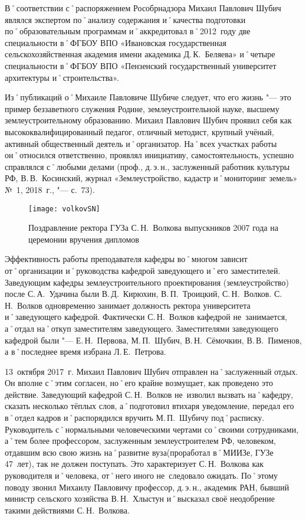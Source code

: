 В˚соответствии с˚распоряжением Рособрнадзора Михаил Павлович Шубич являлся экспертом по˚анализу содержания и˚качества подготовки по˚образовательным программам и˚аккредитовал в˚2012~году две специальности в˚ФГБОУ ВПО «Ивановская государственная сельскохозяйственная академия имени академика Д.\,К.~Беляева» и˚четыре специальности в˚ФГБОУ ВПО «Пензенский государственный университет архитектуры и˚строительства». 

Из˚публикаций о˚Михаиле Павловиче Шубиче следует, что его жизнь "--- это пример беззаветного служения Родине, землеустроительной науке, высшему землеустроительному образованию. Михаил Павлович Шубич проявил себя как высококвалифицированный педагог, отличный методист, крупный учёный, активный общественный деятель и˚организатор. На˚всех участках работы он˚относился ответственно, проявлял инициативу, самостоятельность, успешно справлялся с˚любыми делами (проф., д.\,э.\,н., заслуженный работник культуры РФ, В.\,В.~Косинский, журнал «Землеустройство, кадастр и˚мониторинг земель» №~1, 2018~г., "--- с.~73). 

\begin{wrapfigure}{O}{.4\textwidth}
\centering
\texttt{[image: volkovSN]}
\caption[Поздравление ректора ГУЗа С.\,Н.~Волкова выпускников 2007 года на церемонии вручения дипломов]{Поздравление ректора ГУЗа С.\,Н.~Волкова выпускников 2007 года на церемонии вручения дипломов\footnotemark}
\label{fig:volkovSN}
\end{wrapfigure}

Эффективность работы преподавателя кафедры во˚многом зависит от˚организации и˚руководства кафедрой заведующего и˚его заместителей. Заведующим кафедры землеустроительного проектирования (землеустройство) после С.\,А.~Удачина были В.\,Д.~Кирюхин, В.\,П.~Троицкий, С.\,Н.~Волков. С.\,Н.~Волков одновременно занимает должность ректора университета и˚заведующего кафедрой. Фактически С.\,Н.~Волков кафедрой не~занимается, а˚отдал на˚откуп заместителям заведующего. Заместителями заведующего кафедрой были "---  Е.\,Н.~Первова, М.\,П.~Шубич, В.\,Н.~Сёмочкин, В.\,В.~Пименов, а в˚последнее время избрана Л.\,Е.~Петрова.

13~октября 2017~г. Михаил Павлович Шубич отправлен на˚заслуженный отдых. Он вполне с˚этим согласен, но˚его крайне возмущает, как проведено это действие. Заведующий кафедрой С.\,Н.~Волков не~изволил вызвать на˚кафедру, сказать несколько тёплых слов, а˚подготовил втихаря уведомление, передал его в˚отдел кадров и˚распорядился вручить М.\,П.~Шубичу под˚расписку. Руководитель с˚нормальными человеческими чертами со˚своими сотрудниками, а˚тем более профессором, заслуженным землеустроителем РФ, человеком, отдавшим всю свою жизнь на˚развитие вуза(проработал в˚МИИЗе, ГУЗе 47~лет), так не должен поступать. Это характеризует С.\,Н.~Волкова как руководителя и˚человека, от˚него иного не~следовало ожидать. По˚этому поводу звонил Михаилу Павловичу профессор, д.\,э.\,н., академик РАН, бывший министр сельского хозяйства В.\,Н.~Хлыстун и˚высказал своё неодобрение такими действиями С.\,Н.~Волкова.

